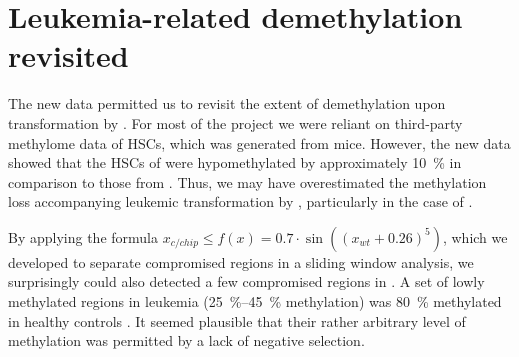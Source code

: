 \section{Leukemia-related demethylation revisited}
 \label{chap:r:wgbs_chip_hsc:leukemia}\label{chap:r:wgbs_chip_hsc:compromised}
 
 The new data permitted us to revisit the extent of demethylation upon transformation by \mllafnine {}. For most of the project we were reliant on third-party methylome data of HSCs, which was generated from \mmblsix mice\cite{Jeong2014}. However, the new data showed that the HSCs of \dnmtwt \mmsvjae were hypomethylated by approximately \SI{10}{\percent} in comparison to those from \mmblsix \supple. Thus, we may have overestimated the methylation loss  accompanying leukemic transformation by \mllafnine {}, particularly in the case of \dnmtwt. 
 
 By applying the formula $x_{c/chip} \leq f(x) = 0.7 \cdot \sin ((x_{wt} + 0.26)^5)$, which we developed to separate compromised regions in a sliding window analysis, we surprisingly could also detected a few compromised regions in \dnmtwt.  A set of lowly methylated regions in leukemia (\SIrange{25}{45}{\percent} methylation) was \SI{80}{\percent} methylated in \dnmtwt healthy controls \supple.  It seemed plausible that their rather arbitrary level of methylation was permitted by a lack of negative selection.	
